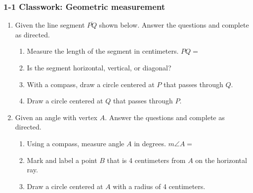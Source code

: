\documentclass[12pt, oneside]{article}
\begin{document}
\subsubsection*{1-1 Classwork: Geometric measurement}
  \vspace{0.5cm}
  \begin{enumerate}

  \item Given the line segment $\overline{PQ}$ shown below. Answer the questions and complete as directed.
    \begin{enumerate}
      \item Measure the length of the segment in centimeters. $PQ=$
      \bigskip
      \item Is the segment horizontal, vertical, or diagonal?
      \bigskip
      \item With a compass, draw a circle centered at $P$ that passes through $Q$.
      \bigskip
      \item Draw a circle centered at $Q$ that passes through $P$.
    \end{enumerate}
    \vspace{7cm}
    \begin{center}
    \end{center}
  
\newpage

  \item Given an angle with vertex $A$. Answer the questions and complete as directed.
    \begin{enumerate}
      \item Using a compass, measure angle $A$ in degrees. $m\angle A =$
      \bigskip
      \item Mark and label a point $B$ that is 4 centimeters from $A$ on the horizontal ray.
      \bigskip
      \item Draw a circle centered at $A$ with a radius of 4 centimeters. \bigskip
    \end{enumerate}
    \vspace{3cm}
    \begin{center}
    \end{center}


\end{enumerate}
\end{document}
